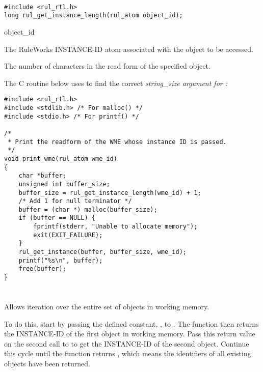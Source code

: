 \begin{args}
   \\
\end{args}

\CBinding
\begin{verbatim}
#include <rul_rtl.h>
long rul_get_instance_length(rul_atom object_id);
\end{verbatim}

\begin{argument}
\item[object\_id]

  The RuleWorks INSTANCE-ID atom associated with the object to be
  accessed.
\end{argument}

\ReturnValue

The number of characters in the read form of the specified object.

\Example

The C routine below uses  to find the correct
\it{string\_size} argument for :

\begin{verbatim}
#include <rul_rtl.h>
#include <stdlib.h> /* For malloc() */
#include <stdio.h> /* For printf() */

/*
 * Print the readform of the WME whose instance ID is passed.
 */
void print_wme(rul_atom wme_id)
{
    char *buffer;
    unsigned int buffer_size;
    buffer_size = rul_get_instance_length(wme_id) + 1;
    /* Add 1 for null terminator */
    buffer = (char *) malloc(buffer_size);
    if (buffer == NULL) {
        fprintf(stderr, "Unable to allocate memory");
        exit(EXIT_FAILURE);
    }
    rul_get_instance(buffer, buffer_size, wme_id);
    printf("%s\n", buffer);
    free(buffer);
}
\end{verbatim}

\begin{seealso}  
\end{seealso}

\section*{}

Allows iteration over the entire set of objects in working memory.

To do this, start by passing the defined constant,
, to . The
function then returns the INSTANCE-ID of the first object in working
memory. Pass this return value on the second call to
 to get the INSTANCE-ID of the second
object. Continue this cycle until the function returns
, which means the identifiers of all existing
objects have been returned.

